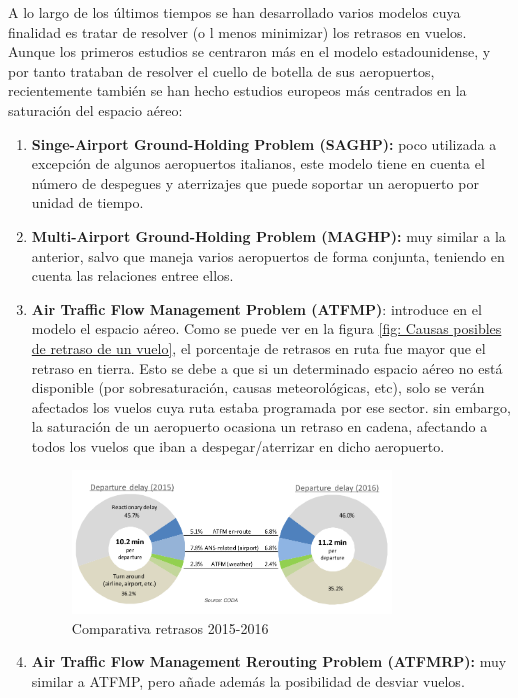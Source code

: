 A lo largo de los últimos tiempos se han desarrollado varios modelos cuya finalidad es tratar de resolver (o l menos minimizar) los retrasos en vuelos. Aunque los primeros estudios se centraron más en el modelo estadounidense, y por tanto trataban de resolver el cuello de botella de sus aeropuertos, recientemente también se han hecho estudios europeos más centrados en la saturación del espacio aéreo: 
\begin{enumerate}
	\item \textbf{Singe-Airport Ground-Holding Problem (SAGHP):} poco utilizada a excepción de algunos aeropuertos italianos, este modelo tiene en cuenta el número de despegues y aterrizajes que puede soportar un aeropuerto por unidad de tiempo.
	\item \textbf{Multi-Airport Ground-Holding Problem (MAGHP): }muy similar a la anterior, salvo que maneja varios aeropuertos de forma conjunta, teniendo en cuenta las relaciones entree ellos.
	\item \textbf{Air Traffic Flow Management Problem (ATFMP)}: introduce en el modelo el espacio aéreo. Como se puede ver en la figura \ref{fig: Causas posibles de retraso de un vuelo}, el porcentaje de retrasos en ruta fue mayor que el retraso en tierra. Esto se debe a que si un determinado espacio aéreo no está disponible (por sobresaturación, causas meteorológicas, etc), solo se verán afectados los vuelos cuya ruta estaba programada por ese sector. sin embargo, la saturación de un aeropuerto ocasiona un retraso en cadena, afectando a todos los vuelos que iban a despegar/aterrizar en dicho aeropuerto.
	\begin{figure}[H]
		\begin{center}
			\centering
			\includegraphics[width=0.8\textwidth]{./imagenes/introduccion/retrasosSalida.png}
			\caption{Comparativa retrasos 2015-2016}
			\label{fig: Comparativa retrasos 2015-2016}
		\end{center}
	\end{figure}
	\item \textbf{Air Traffic Flow Management Rerouting Problem (ATFMRP): }muy similar a ATFMP, pero añade además la posibilidad de desviar vuelos.

\end{enumerate}
